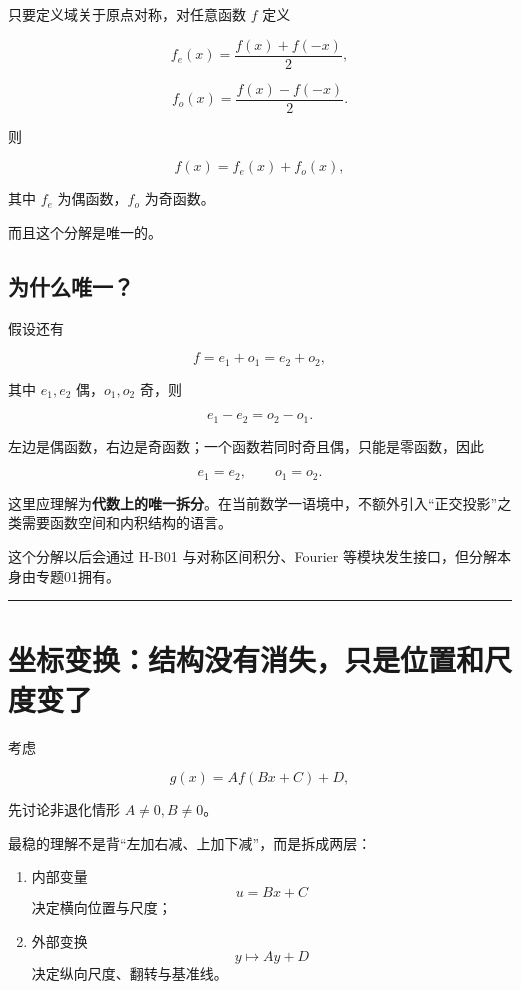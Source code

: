 \documentclass[11pt,a4paper]{ctexart}
\providecommand{\tightlist}{}
\begin{document}
只要定义域关于原点对称，对任意函数 \(f\) 定义

\[
f_e(x)=\frac{f(x)+f(-x)}2,
\]

\[
f_o(x)=\frac{f(x)-f(-x)}2.
\]

则

\[
\boxed{f(x)=f_e(x)+f_o(x)},
\]

其中 \(f_e\) 为偶函数，\(f_o\) 为奇函数。

而且这个分解是唯一的。

\subsection{为什么唯一？}\label{ux4e3aux4ec0ux4e48ux552fux4e00}

假设还有

\[
f=e_1+o_1=e_2+o_2,
\]

其中 \(e_1,e_2\) 偶，\(o_1,o_2\) 奇，则

\[
e_1-e_2=o_2-o_1.
\]

左边是偶函数，右边是奇函数；一个函数若同时奇且偶，只能是零函数，因此

\[
e_1=e_2,\qquad o_1=o_2.
\]

这里应理解为\textbf{代数上的唯一拆分}。在当前数学一语境中，不额外引入``正交投影''之类需要函数空间和内积结构的语言。

这个分解以后会通过 H-B01 与对称区间积分、Fourier
等模块发生接口，但分解本身由专题01拥有。

\begin{center}\rule{0.5\linewidth}{0.5pt}\end{center}

\section{坐标变换：结构没有消失，只是位置和尺度变了}\label{ux5750ux6807ux53d8ux6362ux7ed3ux6784ux6ca1ux6709ux6d88ux5931ux53eaux662fux4f4dux7f6eux548cux5c3aux5ea6ux53d8ux4e86}

考虑

\[
g(x)=A f(Bx+C)+D,
\]

先讨论非退化情形 \(A\ne0,B\ne0\)。

最稳的理解不是背``左加右减、上加下减''，而是拆成两层：

\begin{enumerate}
\def\labelenumi{\arabic{enumi}.}
\tightlist
\item
  内部变量 \[
  u=Bx+C
  \] 决定横向位置与尺度；
\item
  外部变换 \[
  y\mapsto Ay+D
  \] 决定纵向尺度、翻转与基准线。
\end{enumerate}
\end{document}
